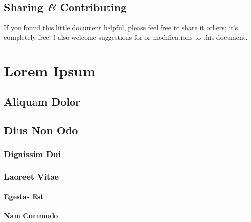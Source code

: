 \documentclass[twoside, onecolumn, bibliography=totoc, parskip=half*]{scrartcl}
\begin{document}
\subsection{Sharing \emph{\&} Contributing}
\label{subsec:sharing_and_contributing}

If you found this little document helpful, please feel free to share it others;
it's completely free!  I also welcome suggestions for or modifications to this
document.


\clearpage
\section{Lorem Ipsum}

\lipsum[1-4]

\subsection{Aliquam Dolor}

\lipsum[6-9]

\subsection{Dius Non Odo}

\lipsum[10]

\subsubsection{Dignissim Dui}

\lipsum[11-12]

\subsubsection{Laoreet Vitae}

\lipsum[13-15]

\paragraph{Egestas Est} \lipsum[16]

\paragraph{Nam Commodo} \lipsum[17]

\lipsum[18-22]


\cleardoublepage
\appendix
{}
\pagestyle{plain}

\cleardoublepage

\printglossaries

\cleardoublepage
\pagestyle{plain}
\printbibliography
\end{document}

